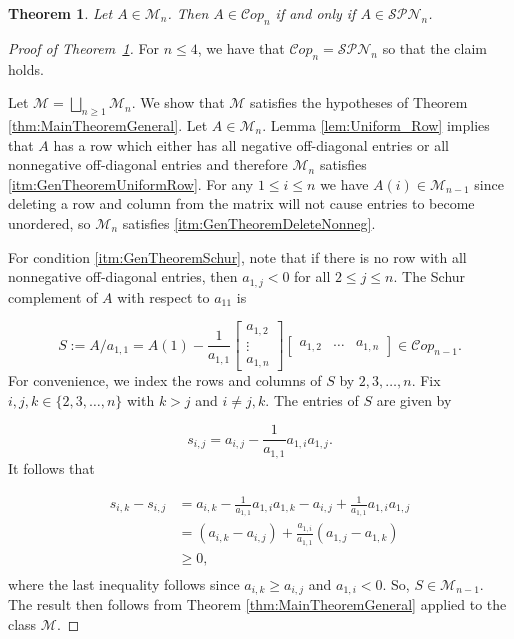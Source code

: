 \documentclass[10pt,a4paper]{amsart}
\newtheorem{theorem}{Theorem}
\newcommand{\Cop}{\mathcal{C}op}
\newcommand{\SPN}{\mathcal{SPN}}
\newcommand{\cM}{\mathcal{M}}
\begin{document}
\begin{theorem}\label{thm:Mn_SPN}
Let $A\in\mathcal{M}_n$. Then $A\in \Cop_n $ if and only if $A \in \mathcal{SPN}_n$.
\end{theorem}

\begin{proof}[Proof of Theorem~\ref{thm:Mn_SPN}]
For $n \leq 4$, we have that $\Cop_n = \SPN_n$ so that the claim holds. 

Let $\cM = \bigsqcup_{n\geq 1} \cM_n$. We show that $\cM$ satisfies the hypotheses of Theorem \ref{thm:MainTheoremGeneral}. Let $A \in \cM_n$.  Lemma \ref{lem:Uniform_Row} implies that $A$ has a row which either has all negative off-diagonal entries or all nonnegative off-diagonal entries and therefore $\cM_n$ satisfies \ref{itm:GenTheoremUniformRow}. 
For any $1\leq i\leq n$ we have $A(i) \in \cM_{n-1}$ since deleting a row and column from the matrix will not cause entries to become unordered, so $\cM_n$ satisfies \ref{itm:GenTheoremDeleteNonneg}.

For condition \ref{itm:GenTheoremSchur}, note that if there is no row with all nonnegative off-diagonal entries, then $a_{1,j} < 0 $ for all $2 \leq j \leq n$. The Schur complement of $A$ with respect to $a_{11}$ is

\[S:= A/a_{1,1} = A(1) - \frac{1}{a_{1,1}}\begin{bmatrix} a_{1,2} \\ \vdots \\ a_{1,n}\end{bmatrix}\begin{bmatrix} a_{1,2} & \dots & a_{1,n}\end{bmatrix} \in \Cop_{n-1}.\]
%
For convenience, we index the rows and columns of $S$ by $2,3, \dots, n$. Fix $i,j,k \in \{2,3,\ldots, n\}$ with $k > j$ and $i\neq j,k$. The entries of $S$ are given by 

\[s_{i,j} = a_{i,j} - \frac{1}{a_{1,1}}a_{1,i}a_{1,j}.\]
%
It follows that 

\[\begin{aligned}
s_{i,k} - s_{i,j} &= a_{i,k} - \frac{1}{a_{1,1}}a_{1,i}a_{1,k} - a_{i,j} + \frac{1}{a_{1,1}}a_{1,i}a_{1,j}\\
&= \left(a_{i,k} - a_{i,j}\right) + \frac{a_{1,i}}{a_{1,1}}(a_{1,j} - a_{1,k})\\
&\geq 0,\\
\end{aligned}\]
%
where the last inequality follows since $a_{i,k}\geq a_{i,j}$ and $a_{1,i} < 0$. So, $S \in \cM_{n-1}$. The result then follows from Theorem \ref{thm:MainTheoremGeneral} applied to the class $\cM$. \end{proof}
\end{document}
